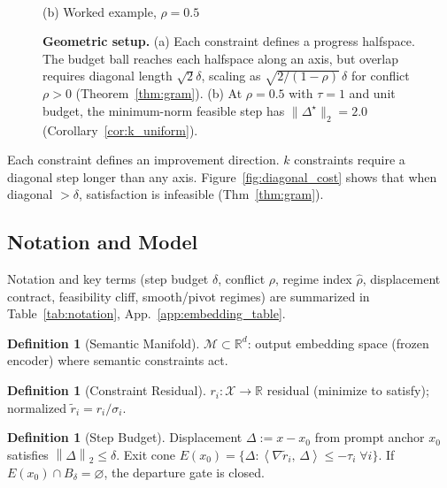 \documentclass{article}
\theoremstyle{plain}
\theoremstyle{definition}
\newtheorem{definition}[theorem]{Definition}
\theoremstyle{remark}
\newcommand{\R}{\mathbb{R}}
\newcommand{\X}{\mathcal{X}}
\newcommand{\ip}[2]{\left\langle #1,\, #2 \right\rangle}
\newcommand{\norm}[1]{\left\lVert #1 \right\rVert}
\newcommand{\rhohat}{\hat{\rho}}
\newcommand{\appref}[1]{App.~\ref{#1}}
\begin{document}
\begin{figure}[ht]
\begin{minipage}[b]{0.48\columnwidth}
\\(b) Worked example, $\rho{=}0.5$
\end{minipage}
\caption{\textbf{Geometric setup.} (a) Each constraint defines a progress halfspace. The budget ball reaches each halfspace along an axis, but overlap requires diagonal length $\sqrt{2}\delta$, scaling as $\sqrt{2/(1-\rho)}\,\delta$ for conflict $\rho>0$ (Theorem~\ref{thm:gram}). (b) At $\rho=0.5$ with $\tau=1$ and unit budget, the minimum-norm feasible step has $\|\Delta^\star\|_2 = 2.0$ (Corollary~\ref{cor:k_uniform}).}
\label{fig:geometric_setup}\label{fig:diagonal_cost}\label{fig:worked_geometry}
\end{figure}

Each constraint defines an improvement direction. $k$ constraints require a diagonal step longer than any axis. Figure~\ref{fig:diagonal_cost} shows that when diagonal $> \delta$, satisfaction is infeasible (Thm~\ref{thm:gram}).

\subsection{Notation and Model}

Notation and key terms (step budget $\delta$, conflict $\rho$, regime index $\rhohat$, displacement contract, feasibility cliff, smooth/pivot regimes) are summarized in Table~\ref{tab:notation}, \appref{app:embedding_table}.

\begin{definition}[Semantic Manifold]\label{def:state_space}
$\mathcal{M} \subset \R^d$: output embedding space (frozen encoder) where semantic constraints act.
\end{definition}

\begin{definition}[Constraint Residual]\label{def:residual}
$r_i:\X\to\R$ residual (minimize to satisfy); normalized $\tilde{r}_i = r_i/\sigma_i$.
\end{definition}

\begin{definition}[Step Budget]\label{def:budget}
Displacement $\Delta := x - x_0$ from prompt anchor $x_0$ satisfies $\norm{\Delta}_2 \le \delta$. Exit cone $E(x_0) = \{\Delta : \ip{\nabla \tilde{r}_i}{\Delta} \le -\tau_i \;\forall i\}$. If $E(x_0) \cap B_\delta = \varnothing$, the departure gate is closed.
\end{definition}
\end{document}
